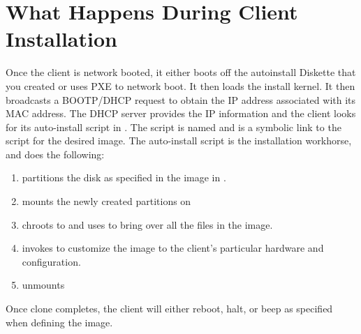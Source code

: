 %
%
%

\section{What Happens During Client Installation}
\label{app:client-install}

Once the client is network booted, it either boots off the autoinstall
Diskette that you created or uses PXE to network boot.  It then loads
the install kernel.  It then broadcasts a BOOTP/DHCP request to obtain
the IP address associated with its MAC address. The DHCP server
provides the IP information and the client looks for its auto-install
script in . The script is named
 and is a symbolic link to the script for the
desired image.  The auto-install script is the installation workhorse,
and does the following:

\begin{enumerate}
\item partitions the disk as specified in the image in
  .
        
\item mounts the newly created partitions on 
  
\item chroots to  and uses  to bring over all the
  files in the image.
  
\item invokes  to customize the image to the
  client's particular hardware and configuration.

\item unmounts 
\end{enumerate}

Once clone completes, the client will either reboot, halt, or beep as
specified when defining the image.


